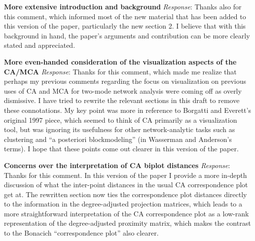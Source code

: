 \documentclass{article}
\begin{document}
\noindent\textbf{More extensive introduction and background}\newline
\textit{Response}: Thanks also for this comment, which informed most of the new material that has been added to this version of the paper, particularly the new section 2. I believe that with this background in hand, the paper's arguments and contribution can be more clearly stated and appreciated. \newline

\noindent\textbf{More even-handed consideration of the visualization aspects of the CA/MCA}\newline
\textit{Response}: Thanks for this comment, which made me realize that perhaps my previous comments regarding the focus on visualization on previous uses of CA and MCA for two-mode network analysis were coming off as overly dismissive. I have tried to rewrite the relevant sections in this draft to remove these connotations. My key point was more in reference to Borgatti and Everett's original 1997 piece, which seemed to think of CA primarily as a visualization tool, but was ignoring its usefulness for other network-analytic tasks such as clustering and ``a posteriori blockmodeling'' (in Wasserman and Anderson's terms). I hope that these points come out clearer in this version of the paper.  \newline

\noindent\textbf{Concerns over the interpretation of CA biplot distances}\newline
\textit{Response}: Thanks for this comment. In this version of the paper I provide a more in-depth discussion of what the inter-point distances in the usual CA correspondence plot get at. The rewritten section now ties the correspondence plot distances directly to the information in the degree-adjusted projection matrices, which leads to a more straightforward interpretation of the CA correspondence plot as a low-rank representation of the degree-adjusted proximity matrix, which makes the contrast to the Bonacich ``correspondence plot'' also clearer. \newline
\end{document}
